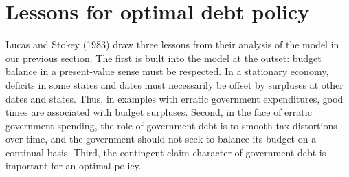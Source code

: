 \section{Lessons for optimal debt policy}\label{LS_lessons_debt}%
Lucas and Stokey (1983)
draw three lessons from their analysis of the model in our previous section. The
first is built into the model at the outset: budget balance in a present-value
 sense must be respected. In a stationary economy,  deficits in some states and dates must
 necessarily be offset by  surpluses
at other dates and states. Thus, in  examples with erratic government expenditures,
good times are associated with budget surpluses. Second, in the face of
erratic government spending, the role of government debt is to smooth
tax distortions over time, and the government should not seek
to balance its budget on a continual basis. Third, the
contingent-claim character of government debt is important for an
optimal policy.

